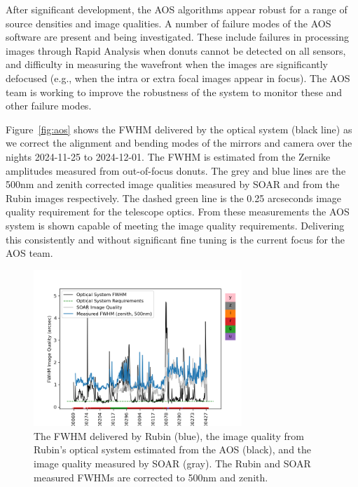 After significant development, the AOS algorithms appear robust for a range of source densities and image qualities. A number of failure modes of the AOS software are present and being investigated. These include failures in processing images through Rapid Analysis when donuts cannot be detected on all sensors, and difficulty in measuring the wavefront when the images are significantly defocused (e.g., when the intra or extra focal images appear in focus). The AOS team is working to improve the robustness of the system to monitor these and other failure modes.

Figure~\ref{fig:aos} shows the FWHM delivered by the optical system (black line) as we correct the alignment and bending modes of the mirrors and camera over the nights 2024-11-25 to 2024-12-01. The FWHM is estimated from the Zernike amplitudes measured from out-of-focus donuts. The grey and blue lines are the 500nm and zenith corrected image qualities measured by SOAR and from the Rubin images respectively. The dashed green line is the 0.25 arcseconds image quality requirement for the telescope optics. From these measurements the AOS system is shown capable of meeting the image quality requirements. Delivering this consistently and without significant fine tuning is the current focus for the AOS team.

\begin{figure}
    \includegraphics[width=0.7\textwidth]{figures/optical_performance.png}
    \caption{The FWHM delivered by Rubin (blue), the image quality from Rubin's optical system estimated from the AOS (black), and the  image quality measured by SOAR (gray). The Rubin and SOAR measured FWHMs are corrected to 500nm and zenith.}
\end{figure}


